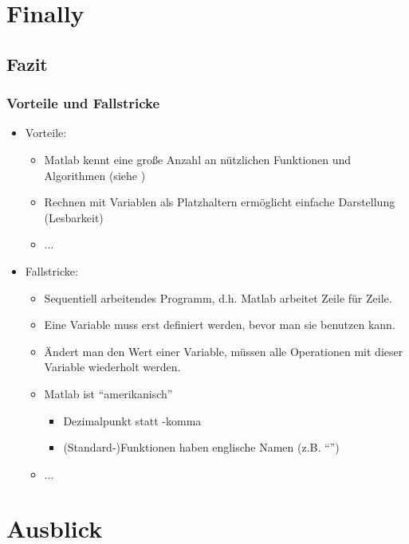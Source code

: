     \section{Finally}

    \subsection{Fazit}
    \begin{frame}
      \frametitle{Vorteile und Fallstricke}
      \begin{itemize}
          \item Vorteile:
          \begin{itemize}
              \item Matlab kennt eine große Anzahl an nützlichen Funktionen und Algorithmen (siehe )
              \item Rechnen mit Variablen als Platzhaltern ermöglicht einfache Darstellung (Lesbarkeit)
              \item ...
          \end{itemize}
          \item Fallstricke:
          \begin{itemize}
              \item Sequentiell arbeitendes Programm, d.h. Matlab arbeitet Zeile für Zeile.
              \item Eine Variable muss erst definiert werden,
              bevor man sie benutzen kann.
              \item Ändert man den Wert einer Variable, müssen alle Operationen mit dieser Variable wiederholt werden.
              \item Matlab ist ``amerikanisch''
              \begin{itemize}
                  \item Dezimalpunkt statt -komma
                  \item (Standard-)Funktionen haben englische Namen (z.B. ``'')
              \end{itemize}
              \item ...
          \end{itemize}
      \end{itemize}
    \end{frame}

    \section{Ausblick}
